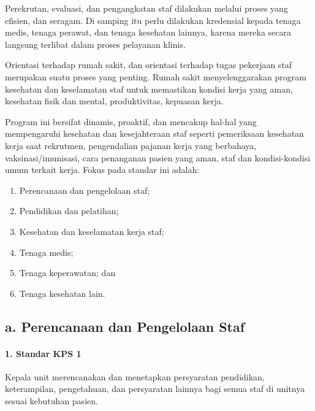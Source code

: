 \documentclass[
]{book}
\providecommand{\tightlist}{%
  \setlength{\itemsep}{0pt}\setlength{\parskip}{0pt}}
\begin{document}
Perekrutan, evaluasi, dan pengangkatan staf dilakukan melalui proses yang efisien, dan seragam. Di samping itu perlu dilakukan kredensial kepada tenaga medis, tenaga perawat, dan tenaga kesehatan lainnya, karena mereka secara langsung terlibat dalam proses pelayanan klinis.

Orientasi terhadap rumah sakit, dan orientasi terhadap tugas pekerjaan staf merupakan suatu proses yang penting. Rumah sakit menyelenggarakan program kesehatan dan keselamatan staf untuk memastikan kondisi kerja yang aman, kesehatan fisik dan mental, produktivitas, kepuasan kerja.

Program ini bersifat dinamis, proaktif, dan mencakup hal-hal yang mempengaruhi kesehatan dan kesejahteraan staf seperti pemeriksaan kesehatan kerja saat rekrutmen, pengendalian pajanan kerja yang berbahaya, vaksinasi/imunisasi, cara penanganan pasien yang aman, staf dan kondisi-kondisi umum terkait kerja.
Fokus pada standar ini adalah:

\begin{enumerate}
\def\labelenumi{\alph{enumi}.}
\tightlist
\item
  Perencanaan dan pengelolaan staf;
\item
  Pendidikan dan pelatihan;
\item
  Kesehatan dan keselamatan kerja staf;
\item
  Tenaga medis;
\item
  Tenaga keperawatan; dan
\item
  Tenaga kesehatan lain.
\end{enumerate}

\hypertarget{a.-perencanaan-dan-pengelolaan-staf}{%
\subsection*{a. Perencanaan dan Pengelolaan Staf}\label{a.-perencanaan-dan-pengelolaan-staf}}

\hypertarget{standar-kps-1}{%
\paragraph*{1. Standar KPS 1}\label{standar-kps-1}}

Kepala unit merencanakan dan menetapkan persyaratan pendidikan, keterampilan, pengetahuan, dan persyaratan lainnya bagi semua staf di unitnya sesuai kebutuhan pasien.
\end{document}
